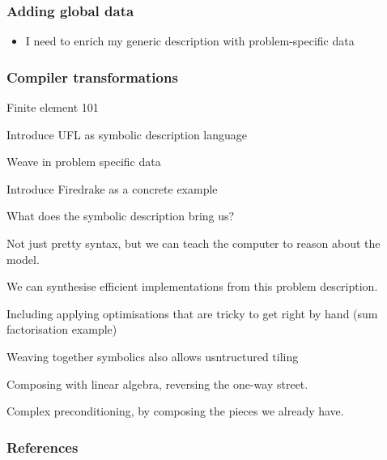 \documentclass[presentation]{beamer}
\begin{document}
\begin{frame}
  \frametitle{Adding global data}
  \begin{itemize}
  \item I need to enrich my generic description with problem-specific data
  \end{itemize}
\end{frame}
\begin{frame}
  \frametitle{Compiler transformations}

\end{frame}
\begin{frame}
  Finite element 101

  Introduce UFL as symbolic description language

  Weave in problem specific data

  Introduce Firedrake as a concrete example

  What does the symbolic description bring us?

  Not just pretty syntax, but we can teach the computer to reason
  about the model.

  We can synthesise efficient implementations from this problem
  description.

  Including applying optimisations that are tricky to get right by
  hand (sum factorisation example)

  Weaving together symbolics also allows usntructured tiling

  Composing with linear algebra, reversing the one-way street.

  Complex preconditioning, by composing the pieces we already have.
\end{frame}
\appendix
\begin{frame}[t,allowframebreaks]
  \frametitle{References}
  \printbibliography[heading=none]
\end{frame}
\end{document}
